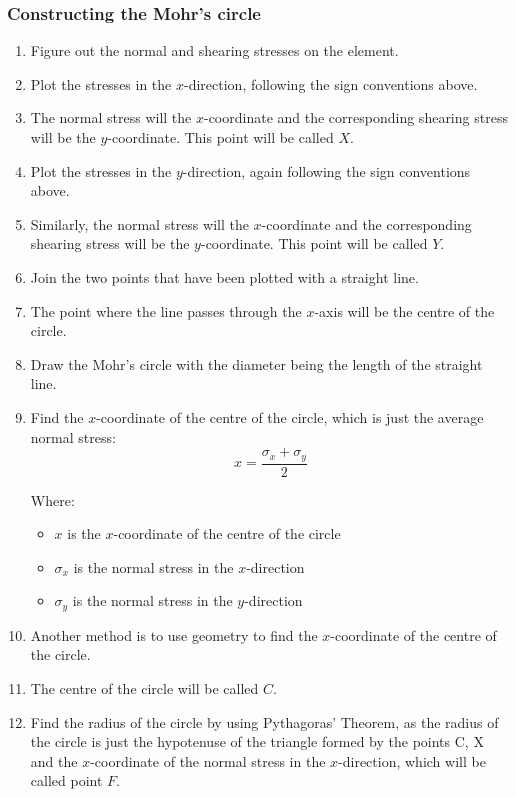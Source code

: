 \documentclass[11pt]{article}
\begin{document}
\subsubsection{Constructing the Mohr's circle}
\label{sec:org65459b2}
\begin{enumerate}
\item Figure out the normal and shearing stresses on the element.
\item Plot the stresses in the \(x\)-direction, following the sign conventions above.
\item The normal stress will the \(x\)-coordinate and the corresponding shearing stress will be the \(y\)-coordinate. This point will be called \(X\).
\item Plot the stresses in the \(y\)-direction, again following the sign conventions above.
\item Similarly, the normal stress will the \(x\)-coordinate and the corresponding shearing stress will be the \(y\)-coordinate. This point will be called \(Y\).
\item Join the two points that have been plotted with a straight line.
\item The point where the line passes through the \(x\)-axis will be the centre of the circle.
\item Draw the Mohr's circle with the diameter being the length of the straight line.
\item Find the \(x\)-coordinate of the centre of the circle, which is just the average normal stress:
\[x = \frac{\sigma_x + \sigma_y}{2}\]

Where:
\begin{itemize}
\item \(x\) is the \(x\)-coordinate of the centre of the circle
\item \(\sigma_x\) is the normal stress in the \(x\)-direction
\item \(\sigma_y\) is the normal stress in the \(y\)-direction
\end{itemize}

\item Another method is to use geometry to find the \(x\)-coordinate of the centre of the circle.
\item The centre of the circle will be called \(C\).
\item Find the radius of the circle by using Pythagoras' Theorem, as the radius of the circle is just the hypotenuse of the triangle formed by the points C, X and the \(x\)-coordinate of the normal stress in the \(x\)-direction, which will be called point \(F\).
\end{enumerate}
\end{document}
